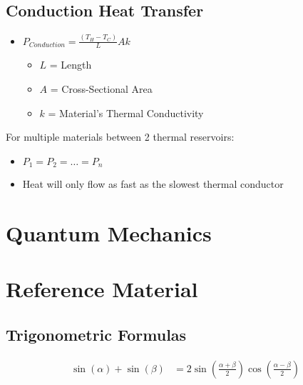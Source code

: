\documentclass[10pt,letterpaper,final,twoside,notitlepage]{article}
\numberwithin{equation}{section} %
\begin{document}
	\subsection*{Conduction Heat Transfer} \label{subsec:Conduction Heat Transfer}
	\begin{itemize}[noitemsep, nolistsep]
		\item $P_{Conduction} = \frac{\left( T_{H} - T_{C} \right)}{L} Ak$
		\begin{itemize}[noitemsep, nolistsep]
			\item $L$ = Length
			\item $A$ = Cross-Sectional Area
			\item $k$ = Material's Thermal Conductivity
		\end{itemize}
	\end{itemize}
	For multiple materials between 2 thermal reservoirs:
	\begin{itemize}[noitemsep, nolistsep]
		\item $P_{1} = P_{2} = \ldots = P_{n}$
		\item Heat will only flow as fast as the slowest thermal conductor
	\end{itemize}

\section{Quantum Mechanics} \label{sec:Quantum Mech}
\section{Reference Material} \label{sec:Reference Material}
	\subsection{Trigonometric Formulas} \label{subsec:Trig Formulas}
	\begin{align}
		\sin \left( \alpha \right) + \sin \left( \beta \right) &= 2 \sin \left( \frac{\alpha + \beta}{2} \right) \cos\left( \frac{\alpha - \beta}{2} \right)  \label{eq:Sin plus Sin with diff Angles}
\end{align}
\end{document}
